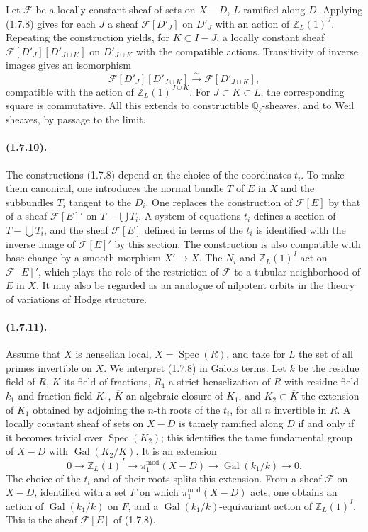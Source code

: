 \documentclass[11pt]{article}
\theoremstyle{remark}
\newcommand{\Qlb}{\overline{\mathbb{Q}}_\ell}
\newcommand{\ZZ}{\mathbb{Z}}
\newcommand{\Spec}{\operatorname{Spec}}
\newcommand{\Gal}{\operatorname{Gal}}
\begin{document}
Let $\mathcal F$ be a locally constant sheaf of sets on $X-D$, $L$-ramified along $D$. Applying (1.7.8) gives for each $J$ a sheaf $\mathcal F[D'_J]$ on $D'_J$ with an action of $\ZZ_L(1)^J$. Repeating the construction yields, for $K\subset I-J$, a locally constant sheaf $\mathcal F[D'_J][D'_{J\cup K}]$ on $D'_{J\cup K}$ with the compatible actions. Transitivity of inverse images gives an isomorphism
\begin{equation}\tag{1.7.9.1}
\mathcal F[D'_J][D'_{J\cup K}]\xrightarrow{\sim}\mathcal F[D'_{J\cup K}],
\end{equation}
compatible with the action of $\ZZ_L(1)^{J\cup K}$. For $J\subset K\subset L$, the corresponding square is commutative. All this extends to constructible $\Qlb$-sheaves, and to Weil sheaves, by passage to the limit.

\paragraph{(1.7.10).}
The constructions (1.7.8) depend on the choice of the coordinates $t_i$. To make them canonical, one introduces the normal bundle $T$ of $E$ in $X$ and the subbundles $T_i$ tangent to the $D_i$. One replaces the construction of $\mathcal F[E]$ by that of a sheaf $\mathcal F[E]'$ on $T-\bigcup T_i$. A system of equations $t_i$ defines a section of $T-\bigcup T_i$, and the sheaf $\mathcal F[E]$ defined in terms of the $t_i$ is identified with the inverse image of $\mathcal F[E]'$ by this section. The construction is also compatible with base change by a smooth morphism $X'\to X$. The $N_i$ and $\ZZ_L(1)^I$ act on $\mathcal F[E]'$, which plays the role of the restriction of $\mathcal F$ to a tubular neighborhood of $E$ in $X$. It may also be regarded as an analogue of nilpotent orbits in the theory of variations of Hodge structure.

\paragraph{(1.7.11).}
Assume that $X$ is henselian local, $X=\Spec(R)$, and take for $L$ the set of all primes invertible on $X$. We interpret (1.7.8) in Galois terms. Let $k$ be the residue field of $R$, $K$ its field of fractions, $R_1$ a strict henselization of $R$ with residue field $k_1$ and fraction field $K_1$, $\overline K$ an algebraic closure of $K_1$, and $K_2\subset \overline K$ the extension of $K_1$ obtained by adjoining the $n$-th roots of the $t_i$, for all $n$ invertible in $R$. A locally constant sheaf of sets on $X-D$ is tamely ramified along $D$ if and only if it becomes trivial over $\Spec(K_2)$; this identifies the tame fundamental group of $X-D$ with $\Gal(K_2/K)$. It is an extension
\[
0\longrightarrow \ZZ_L(1)^I\longrightarrow \pi_1^{\mathrm{mod}}(X-D)\longrightarrow \Gal(k_1/k)\longrightarrow 0.
\]
The choice of the $t_i$ and of their roots splits this extension. From a sheaf $\mathcal F$ on $X-D$, identified with a set $F$ on which $\pi_1^{\mathrm{mod}}(X-D)$ acts, one obtains an action of $\Gal(k_1/k)$ on $F$, and a $\Gal(k_1/k)$-equivariant action of $\ZZ_L(1)^I$. This is the sheaf $\mathcal F[E]$ of (1.7.8).
\end{document}
